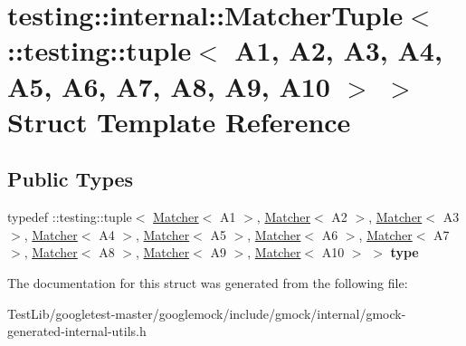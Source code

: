 \hypertarget{structtesting_1_1internal_1_1MatcherTuple_3_01_1_1testing_1_1tuple_3_01A1_00_01A2_00_01A3_00_01Aa256ea461b02eca0db9561b7bbf2c82d}{}\section{testing\+:\+:internal\+:\+:Matcher\+Tuple$<$ \+:\+:testing\+:\+:tuple$<$ A1, A2, A3, A4, A5, A6, A7, A8, A9, A10 $>$ $>$ Struct Template Reference}
\label{structtesting_1_1internal_1_1MatcherTuple_3_01_1_1testing_1_1tuple_3_01A1_00_01A2_00_01A3_00_01Aa256ea461b02eca0db9561b7bbf2c82d}
\subsection*{Public Types}
\begin{DoxyCompactItemize}
\item 
\mbox{\label{structtesting_1_1internal_1_1MatcherTuple_3_01_1_1testing_1_1tuple_3_01A1_00_01A2_00_01A3_00_01Aa256ea461b02eca0db9561b7bbf2c82d_ad8f6e383d160062fe6ccf40a839fdd31}} 
typedef \+::testing\+::tuple$<$ \hyperlink{classtesting_1_1Matcher}{Matcher}$<$ A1 $>$, \hyperlink{classtesting_1_1Matcher}{Matcher}$<$ A2 $>$, \hyperlink{classtesting_1_1Matcher}{Matcher}$<$ A3 $>$, \hyperlink{classtesting_1_1Matcher}{Matcher}$<$ A4 $>$, \hyperlink{classtesting_1_1Matcher}{Matcher}$<$ A5 $>$, \hyperlink{classtesting_1_1Matcher}{Matcher}$<$ A6 $>$, \hyperlink{classtesting_1_1Matcher}{Matcher}$<$ A7 $>$, \hyperlink{classtesting_1_1Matcher}{Matcher}$<$ A8 $>$, \hyperlink{classtesting_1_1Matcher}{Matcher}$<$ A9 $>$, \hyperlink{classtesting_1_1Matcher}{Matcher}$<$ A10 $>$ $>$ {\bfseries type}
\end{DoxyCompactItemize}


The documentation for this struct was generated from the following file\+:\begin{DoxyCompactItemize}
\item 
Test\+Lib/googletest-\/master/googlemock/include/gmock/internal/gmock-\/generated-\/internal-\/utils.\+h\end{DoxyCompactItemize}
